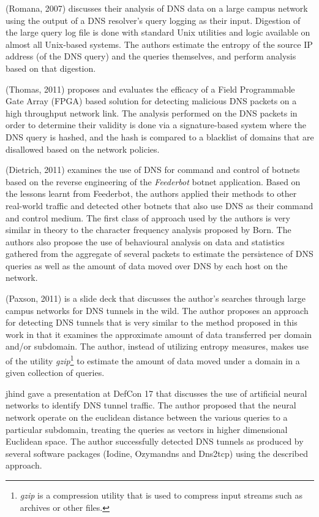 \documentclass{llncs}
\begin{document}
(Romana, 2007)\cite{Romana2007} discusses their analysis of DNS data on a large
campus network using the output of a DNS resolver's query logging as their
input. Digestion of the large query log file is done with standard Unix
utilities and logic available on almost all Unix-based systems. The authors
estimate the entropy of the source IP address (of the DNS query) and the queries
themselves, and perform analysis based on that digestion.

(Thomas, 2011)\cite{Thomas2011} proposes and evaluates the efficacy of a Field
Programmable Gate Array (FPGA) based solution for detecting malicious DNS
packets on a high throughput network link. The analysis performed on the DNS
packets in order to determine their validity is done via a signature-based
system where the DNS query is hashed, and the hash is compared to a blacklist of
domains that are disallowed based on the network policies.

(Dietrich, 2011)\cite{Dietrich2011} examines the use of DNS for command and
control of botnets based on the reverse engineering of the \emph{Feederbot}
botnet application. Based on the lessons learnt from Feederbot, the authors
applied their methods to other real-world traffic and detected other botnets
that also use DNS as their command and control medium. The first class of approach used by the authors is very similar in theory to the character frequency analysis proposed
by Born\cite{Born2010.cfa}. The authors also
propose the use of behavioural analysis on data and statistics gathered from the
aggregate of several packets to estimate the persistence of DNS queries as well
as the amount of data moved over DNS by each host on the network.

(Paxson, 2011)\cite{Paxson2011} is a slide deck that discusses the author's
searches through large campus networks for DNS tunnels in the wild. The author
proposes an approach for detecting DNS tunnels that is very similar to the
method proposed in this work in that it examines the approximate amount of data
transferred per domain and/or subdomain. The author, instead of utilizing
entropy measures, makes use of the utility \emph{gzip}\footnote{\emph{gzip} is a
compression utility that is used to compress input streams such as archives or
other files.} to estimate the amount of data moved under a domain in a given
collection of queries.

jhind\cite{jhind2009} gave a presentation at DefCon 17 that discusses the use of
artificial neural networks to identify DNS tunnel traffic. The author proposed
that the neural network operate on the euclidean distance between the various
queries to a particular subdomain, treating the queries as vectors in higher
dimensional Euclidean space. The author successfully detected DNS tunnels as
produced by several software packages (Iodine, Ozymandns and Dns2tcp) using the
described approach.
\end{document}

